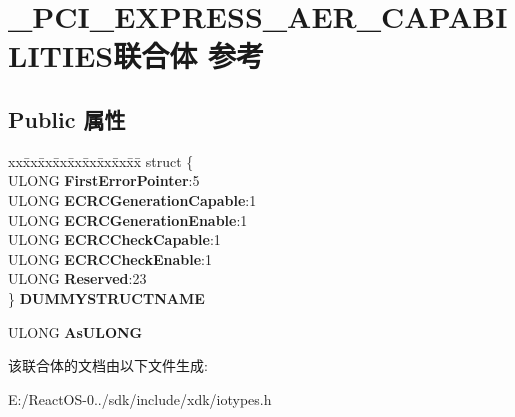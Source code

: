 \hypertarget{union___p_c_i___e_x_p_r_e_s_s___a_e_r___c_a_p_a_b_i_l_i_t_i_e_s}{}\section{\+\_\+\+P\+C\+I\+\_\+\+E\+X\+P\+R\+E\+S\+S\+\_\+\+A\+E\+R\+\_\+\+C\+A\+P\+A\+B\+I\+L\+I\+T\+I\+E\+S联合体 参考}
\label{union___p_c_i___e_x_p_r_e_s_s___a_e_r___c_a_p_a_b_i_l_i_t_i_e_s}
\subsection*{Public 属性}
\begin{DoxyCompactItemize}
\item 
\mbox{\label{union___p_c_i___e_x_p_r_e_s_s___a_e_r___c_a_p_a_b_i_l_i_t_i_e_s_a53043c5d54391b5b65b7e2686b96cad1}} 
\begin{tabbing}
xx\=xx\=xx\=xx\=xx\=xx\=xx\=xx\=xx\=\kill
struct \{\\
\>ULONG {\bfseries FirstErrorPointer}:5\\
\>ULONG {\bfseries ECRCGenerationCapable}:1\\
\>ULONG {\bfseries ECRCGenerationEnable}:1\\
\>ULONG {\bfseries ECRCCheckCapable}:1\\
\>ULONG {\bfseries ECRCCheckEnable}:1\\
\>ULONG {\bfseries Reserved}:23\\
\} {\bfseries DUMMYSTRUCTNAME}\\

\end{tabbing}\item 
\mbox{\label{union___p_c_i___e_x_p_r_e_s_s___a_e_r___c_a_p_a_b_i_l_i_t_i_e_s_a53532cc14da8883bba71abb6f0810970}} 
U\+L\+O\+NG {\bfseries As\+U\+L\+O\+NG}
\end{DoxyCompactItemize}


该联合体的文档由以下文件生成\+:\begin{DoxyCompactItemize}
\item 
E\+:/\+React\+O\+S-\/0../sdk/include/xdk/iotypes.\+h\end{DoxyCompactItemize}
